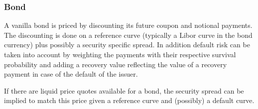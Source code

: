 \subsubsection{Bond}

A vanilla bond is priced by discounting its future coupon and notional payments. The discounting is done on a reference
curve (typically a Libor curve in the bond currency) plus possibly a security specific spread. In addition default risk
can be taken into account by weighting the payments with their respective survival probability and adding a recovery
value reflecting the value of a recovery payment in case of the default of the issuer.

If there are liquid price quotes available for a bond, the security spread can be implied to match this price given a
reference curve and (possibly) a default curve.
